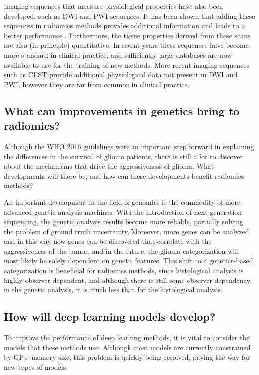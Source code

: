 Imaging sequences that measure physiological properties have also been developed, such as \gls{DWI} and \gls{PWI} sequences.
It has been shown that adding these sequences in radiomics methods provides additional information and leads to a better performance \autocite{park2020radiomicspwi,kim2020diffusion}.
Furthermore, the tissue properties derived from these scans are also (in principle) quantitative.
In recent years these sequences have become more standard in clinical practice, and sufficiently large databases are now available to use for the training of new methods.
More recent imaging sequences such as \gls{CEST} provide additional physiological data not present in \gls{DWI} and \gls{PWI}, however they are far from common in clinical practice.



\subsection{What can improvements in genetics bring to radiomics?}\label{sec:discussion_new_genetics}
Although the \gls{WHO} 2016 guidelines were an important step forward in explaining the differences in the survival of glioma patients, there is still a lot to discover about the mechanisms that drive the aggressiveness of glioma.
What developments will there be, and how can these developments benefit radiomics methods?

An important development in the field of genomics is the commodity of more advanced genetic analysis machines.
With the introduction of next-generation sequencing, the genetic analysis results become more reliable, partially solving the problem of ground truth uncertainty.
Moreover, more genes can be analyzed and in this way new genes can be discovered that correlate with the aggressiveness of the \gls{tumor}, and in the future, the glioma categorization will most likely be solely dependent on genetic features.
This shift to a genetics-based categorization is beneficial for radiomics methods, since histological analysis is highly observer-dependent, and although there is still some observer-dependency in the genetic analysis, it is much less than for the histological analysis.


\subsection{How will deep learning models develop?}

To improve the performance of deep learning methods, it is vital to consider the models that these methods use.
Although most models are currently constrained by GPU memory size, this problem is quickly being resolved, paving the way for new types of models.

